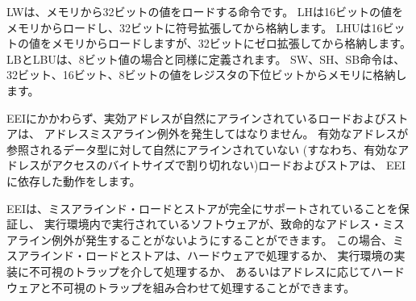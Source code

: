 \begin{comment}
The LW instruction loads a 32-bit value from memory into {\em rd}.  LH
loads a 16-bit value from memory, then sign-extends to 32-bits before
storing in {\em rd}. LHU loads a 16-bit value from memory but then
zero extends to 32-bits before storing in {\em rd}.  LB and LBU are
defined analogously for 8-bit values.  The SW, SH, and SB instructions
store 32-bit, 16-bit, and 8-bit values from the low bits of register
{\em rs2} to memory.
\end{comment}

LWは、メモリから32ビットの値をロードする命令です。 
LHは16ビットの値をメモリからロードし、32ビットに符号拡張してから格納します。
LHUは16ビットの値をメモリからロードしますが、32ビットにゼロ拡張してから格納します。
LBとLBUは、8ビット値の場合と同様に定義されます。
SW、SH、SB命令は、32ビット、16ビット、8ビットの値をレジスタの下位ビットからメモリに格納します。

\begin{comment}
Regardless of EEI, loads and stores whose effective addresses are
naturally aligned shall not raise an address-misaligned exception.
Loads and stores whose effective address is not naturally aligned
to the referenced datatype (i.e., the effective address is
not divisible by the size of the access in bytes) have behavior
dependent on the EEI.
\end{comment}

EEIにかかわらず、実効アドレスが自然にアラインされているロードおよびストアは、
アドレスミスアライン例外を発生してはなりません。
有効なアドレスが参照されるデータ型に対して自然にアラインされていない
(すなわち、有効なアドレスがアクセスのバイトサイズで割り切れない)ロードおよびストアは、
EEIに依存した動作をします。

\begin{comment}
An EEI may guarantee that misaligned loads and stores are fully
supported, and so the software running inside the execution
environment will never experience a contained or fatal
address-misaligned trap.  In this case, the misaligned loads and
stores can be handled in hardware, or via an invisible trap into the
execution environment implementation, or possibly a combination of
hardware and invisible trap depending on address.
\end{comment}

EEIは、ミスアラインド・ロードとストアが完全にサポートされていることを保証し、
実行環境内で実行されているソフトウェアが、致命的なアドレス・ミスアライン例外が発生することがないようにすることができます。 
この場合、ミスアラインド・ロードとストアは、ハードウェアで処理するか、
実行環境の実装に不可視のトラップを介して処理するか、
あるいはアドレスに応じてハードウェアと不可視のトラップを組み合わせて処理することができます。

